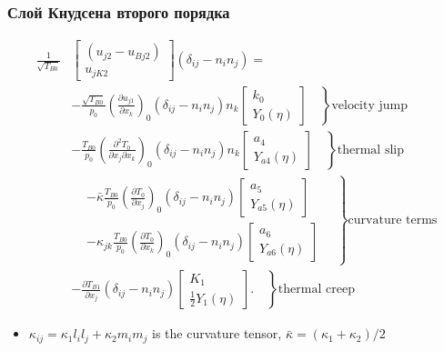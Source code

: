 \documentclass[mathserif]{beamer} %
\newcommand{\pder}[2][]{\frac{\partial#1}{\partial#2}}
\newcommand{\pderder}[3][]{\frac{\partial^2#1}{\partial#2\partial#3}}
\newcommand{\onwall}[1]{\left(#1\right)_0}
\newcommand{\deltann}[2]{(\delta_{#1#2}-n_#1 n_#2)}
\begin{document}
\begin{frame}
    \frametitle{Слой Кнудсена второго порядка}
    \footnotesize
    \begin{equation*}
        \begin{aligned}
            \frac1{\sqrt{T_{B0}}}&
                \begin{bmatrix} (u_{j2} - u_{Bj2}) \\ u_{jK2} \end{bmatrix}\deltann{i}{j} = \\
            &- \left.\frac{\sqrt{T_{B0}}}{p_0}\onwall{\pder[u_{j1}]{x_k}} \deltann{i}{j}n_k
                \begin{bmatrix} k_0 \\ Y_0(\eta) \end{bmatrix} \quad\right\}\text{velocity jump}\\
            &- \left.\frac{T_{B0}}{p_0}\onwall{\pderder[T_0]{x_j}{x_k}} \deltann{i}{j}n_k
                \begin{bmatrix} a_4 \\ Y_{a4}(\eta) \end{bmatrix} \quad\right\}\text{thermal slip} \\
            &\left.\begin{aligned}
                &- \bar\kappa\frac{T_{B0}}{p_0}\onwall{\pder[T_0]{x_j}} \deltann{i}{j}
                \begin{bmatrix} a_5 \\ Y_{a5}(\eta) \end{bmatrix} \\
                &- \kappa_{jk}\frac{T_{B0}}{p_0}\onwall{\pder[T_0]{x_k}} \deltann{i}{j}
                \begin{bmatrix} a_6 \\ Y_{a6}(\eta) \end{bmatrix}
            \end{aligned} \quad\right\}\text{curvature terms}\\
            &- \left.\pder[T_{B1}]{x_j} \deltann{i}{j}
                \begin{bmatrix} K_1 \\ \frac12 Y_1(\eta) \end{bmatrix}. \quad\right\}\text{thermal creep}
        \end{aligned}\label{eq:boundary_u2t}
    \end{equation*}
    \vspace{-10pt}
    \begin{itemize}
        \item \(\kappa_{ij} = \kappa_1 l_i l_j + \kappa_2 m_i m_j\) is the curvature tensor, \(\bar\kappa = (\kappa_1+\kappa_2)/2\)
    \end{itemize}
\end{frame}
\end{document}
